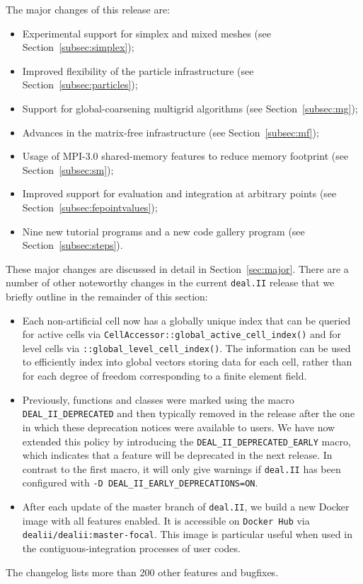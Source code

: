 \documentclass{ansarticle-preprint}
\newcommand{\specialword}[1]{\texttt{#1}}
\newcommand{\dealii}{{\specialword{deal.II}}\xspace}
\begin{document}
The major changes of this release are:
%
\begin{itemize}
  \item Experimental support for simplex and mixed meshes (see Section~\ref{subsec:simplex});
  \item Improved flexibility of the particle infrastructure (see Section~\ref{subsec:particles});
  \item Support for global-coarsening multigrid algorithms (see Section~\ref{subsec:mg});
  \item Advances in the matrix-free infrastructure  (see Section~\ref{subsec:mf});
  \item Usage of MPI-3.0 shared-memory features to reduce memory footprint  (see Section~\ref{subsec:sm});
  \item Improved support for evaluation and integration at arbitrary points (see Section~\ref{subsec:fepointvalues});
  \item Nine new tutorial programs and a new code gallery program (see Section~\ref{subsec:steps}).
\end{itemize}
%
These major changes are discussed in detail in Section~\ref{sec:major}. There
are a number of other noteworthy changes in the current \dealii{} release
that we briefly outline in the remainder of this section:
%
\begin{itemize}
  \item Each non-artificial cell now has a globally unique index that can be queried
  for active cells via \texttt{CellAccessor::global\_active\_cell\_index()} and for level cells 
  via \texttt{::global\_\allowbreak level\_\allowbreak cell\_\allowbreak index()}. The information
  can be used to efficiently index into global vectors storing data
  for each cell, rather than for each degree of freedom corresponding to a finite
  element field.
  
  \item Previously, functions and classes were marked using the 
  macro \texttt{DEAL\_II\_DEPRECATED} and then typically removed in
  the release after the one in which these deprecation notices were
  available to users. We have now extended this policy by introducing
  the \texttt{DEAL\_II\_\allowbreak DEPRECATED\_EARLY} macro, which indicates that a feature will be
  deprecated in the next release. In contrast to the first macro, it will only give
  warnings if \dealii{} has been configured with \texttt{-D DEAL\_II\_EARLY\_DEPRECATIONS=ON}.
  \item After each update of the master branch of \dealii{}, we build a new Docker image
  with all features enabled. It is
  accessible on \texttt{Docker Hub} via \texttt{dealii/dealii:master-focal}. This image is
  particular useful when used in the contiguous-integration processes of user codes.
\end{itemize}
%
The changelog lists more than 200 other features and bugfixes.
\end{document}
